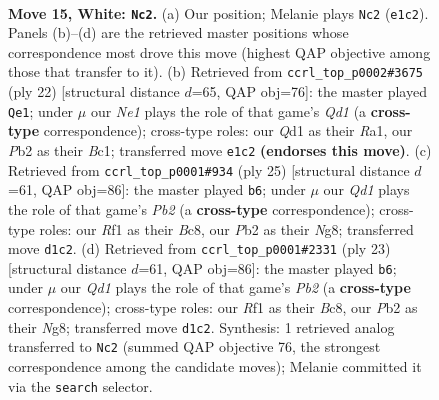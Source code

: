\documentclass[11pt]{article}
\begin{document}
\clearpage

\begin{figure}[p]\centering
\begin{subfigure}{0.46\textwidth}\centering
\resizebox{\linewidth}{!}{%
\newchessgame
\chessboard[
  setfen={rnb1r1k1/pp3pbp/1n3qp1/3p4/3P4/1B5P/PP3PP1/RNBQNRK1 w - - 1 15},
  showmover=false,
  pgfstyle=straightmove, color=movearrow, markmove={e1-c2}
]}
\caption{}
\end{subfigure}\hfill
\begin{subfigure}{0.46\textwidth}\centering
\resizebox{\linewidth}{!}{%
\newchessgame
\chessboard[
  setfen={3rkb1r/pp3ppp/2n1b3/2q1p3/4B3/P4N2/1PP2PPP/R1BQ1RK1 w k - 1 12},
  showmover=false,
  pgfstyle=straightmove, color=movearrow, markmove={d1-e1}
]}
\caption{}
\end{subfigure}
\\[4pt]
\begin{subfigure}{0.46\textwidth}\centering
\resizebox{\linewidth}{!}{%
\newchessgame
\chessboard[
  setfen={r1b2knr/ppq2ppp/2nbp3/8/2B3Q1/1N3N2/PPP2PPP/R1B2RK1 b - - 8 13},
  showmover=false,
  pgfstyle=straightmove, color=movearrow, markmove={b7-b6}
]}
\caption{}
\end{subfigure}\hfill
\begin{subfigure}{0.46\textwidth}\centering
\resizebox{\linewidth}{!}{%
\newchessgame
\chessboard[
  setfen={r1b2knr/ppq2ppp/2nbp3/8/2B3Q1/1N3N2/PPP2PPP/R1B2RK1 b - - 8 12},
  showmover=false,
  pgfstyle=straightmove, color=movearrow, markmove={b7-b6}
]}
\caption{}
\end{subfigure}
\caption{\textbf{Move 15, White: \texttt{Nc2}.} (a) Our position; Melanie plays \texttt{Nc2} (\texttt{e1c2}). Panels (b)--(d) are the retrieved master positions whose correspondence most drove this move (highest QAP objective among those that transfer to it). (b) Retrieved from \texttt{ccrl\_top\_p0002\#3675} (ply 22) [structural distance $d$=65, QAP obj=76]: the master played \texttt{Qe1}; under $\mu$ our \emph{Ne1} plays the role of that game's \emph{Qd1} (a \textbf{cross-type} correspondence); cross-type roles: our \emph{Q}d1 as their \emph{R}a1, our \emph{P}b2 as their \emph{B}c1; transferred move \texttt{e1c2} \textbf{(endorses this move)}. (c) Retrieved from \texttt{ccrl\_top\_p0001\#934} (ply 25) [structural distance $d$=61, QAP obj=86]: the master played \texttt{b6}; under $\mu$ our \emph{Qd1} plays the role of that game's \emph{Pb2} (a \textbf{cross-type} correspondence); cross-type roles: our \emph{R}f1 as their \emph{B}c8, our \emph{P}b2 as their \emph{N}g8; transferred move \texttt{d1c2}. (d) Retrieved from \texttt{ccrl\_top\_p0001\#2331} (ply 23) [structural distance $d$=61, QAP obj=86]: the master played \texttt{b6}; under $\mu$ our \emph{Qd1} plays the role of that game's \emph{Pb2} (a \textbf{cross-type} correspondence); cross-type roles: our \emph{R}f1 as their \emph{B}c8, our \emph{P}b2 as their \emph{N}g8; transferred move \texttt{d1c2}. Synthesis: 1 retrieved analog transferred to \texttt{Nc2} (summed QAP objective 76, the strongest correspondence among the candidate moves); Melanie committed it via the \texttt{search} selector.}
\label{fig:thought-m28}
\end{figure}
\end{document}
